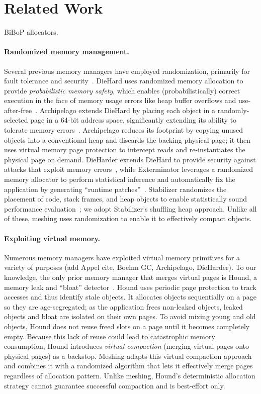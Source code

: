 \section{Related Work}
\label{sec:related}

BiBoP allocators.

\paragraph{Randomized memory management.} Several previous memory managers have employed randomization,
primarily for fault tolerance and
security~\cite{Novark:2010:DSH:1866307.1866371, 1134000, 1346296,
  1250736}. DieHard uses randomized memory allocation to provide
\emph{probabilistic memory safety}, which enables (probabilistically)
correct execution in the face of memory usage errors like heap buffer
overflows and use-after-free~\cite{1134000}. Archipelago extends
DieHard by placing each object in a randomly-selected page in a 64-bit
address space, significantly extending its ability to tolerate memory
errors~\cite{1346296}. Archipelago reduces its footprint by copying
unused objects into a conventional heap and discards the backing
physical page; it then uses virtual memory page protection to
intercept reads and re-instantiates the physical page on
demand. DieHarder extends DieHard to provide security against attacks
that exploit memory errors~\cite{Novark:2010:DSH:1866307.1866371},
while Exterminator leverages a randomized memory allocator to perform
statistical inference and automatically fix the application by
generating ``runtime patches''~\cite{1250736}. Stabilizer randomizes
the placement of code, stack frames, and heap objects to enable
statistically sound performance evaluation~\cite{stabilizer:asplos13};
we adopt Stabilizer's shuffling heap approach. Unlike all of these,
meshing uses randomization to enable it to effectively compact objects.

\paragraph{Exploiting virtual memory.} Numerous memory managers have
exploited virtual memory primitives for a variety of purposes (add
Appel cite, Boehm GC, Archipelago, DieHarder). To our knowledge, the
only prior memory manager that merges virtual pages is Hound, a memory
leak and ``bloat'' detector~\cite{1542521}. Hound uses periodic page
protection to track accesses and thus identify stale objects. It
allocates objects sequentially on a page so they are age-segregated;
as the application frees non-leaked objects, leaked objects and bloat
are isolated on their own pages. To avoid mixing young and old
objects, Hound does not reuse freed slots on a page until it becomes
completely empty. Because this lack of reuse could lead to
catastrophic memory consumption, Hound introduces \emph{virtual
  compaction} (merging virtual pages onto physical pages) as a
backstop. Meshing adapts this virtual compaction approach and combines
it with a randomized algorithm that lets it effectively merge pages
regardless of allocation pattern. Unlike meshing, Hound's deterministic allocation
strategy cannot guarantee successful compaction and is best-effort
only.

